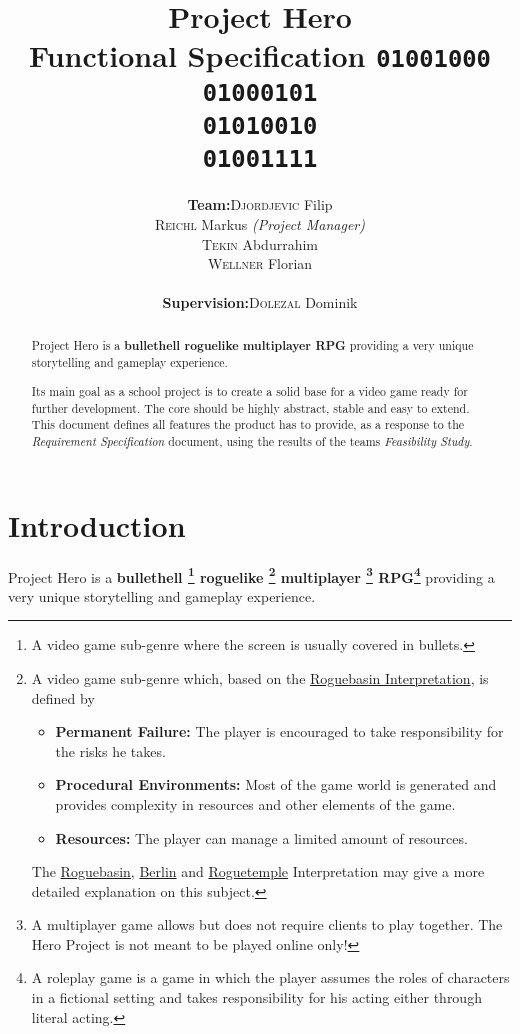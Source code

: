 \documentclass[11pt]{article}
\title{
  \textbf{Project Hero}\\
  \large{Functional Specification}
  \linebreak
  \linebreak
  \small{\texttt{01001000\\01000101\\01010010\\01001111}}
}
\author{
  \begin{tabular}{rl}
    \textbf{Team:}
    & \textsc{Djordjevic} Filip\\
    & \textsc{Reichl} Markus \small{\textit{(Project Manager)}}\\
    & \textsc{Tekin} Abdurrahim\\
    & \textsc{Wellner} Florian\\
    \\
    \textbf{Supervision:}
    & \textsc{Dolezal} Dominik
  \end{tabular}
}
\begin{document}
\begin{titlepage}
  \clearpage
  \maketitle
  \thispagestyle{empty}
  
  \begin{abstract}
    \begin{flushleft}
      Project Hero is a \textbf{bullethell roguelike multiplayer RPG} providing a very unique storytelling and gameplay experience.
      
      Its main goal as a school project is to create a solid base for a video game ready for further development. The core should be highly abstract, stable and easy to extend.
      \linebreak
      \linebreak
      This document defines all features the product has to provide, as a response to the \textit{Requirement Specification} document, using the results of the teams \textit{Feasibility Study}.
     \end{flushleft}
  \end{abstract}
\end{titlepage}

\tableofcontents
\newpage

\section{Introduction}
Project Hero is a \textbf{
  bullethell
  \footnote{A video game sub-genre where the screen is usually covered in bullets.}
  roguelike
  \footnote{A video game sub-genre which, based on the \href{http://roguebasin.com/roguelike-definition}{Roguebasin Interpretation}, is defined by 
    \begin{itemize}
      \item \textbf{Permanent Failure:} The player is encouraged to take responsibility for the risks he takes.
      \item \textbf{Procedural Environments:} Most of the game world is generated and provides complexity in resources and other elements of the game.
      \item \textbf{Resources:} The player can manage a limited amount of resources.
    \end{itemize}
    The \href{http://roguebasin.com/roguelike-definition}{Roguebasin}, \href{http://roguebasin.com/index.php?title=Berlin_Interpretation}{Berlin} and \href{http://roguetemple.com/roguelike-definition}{Roguetemple} Interpretation may give a more detailed explanation on this subject.
  }
  multiplayer
  \footnote{A multiplayer game allows but does not require clients to play together. The Hero Project is not meant to be played online only!}
  RPG\footnote{A roleplay game is a game in which the player assumes the roles of characters in a fictional setting and takes responsibility for his acting either through literal acting.}
} providing a very unique storytelling and gameplay experience.
\end{document}
